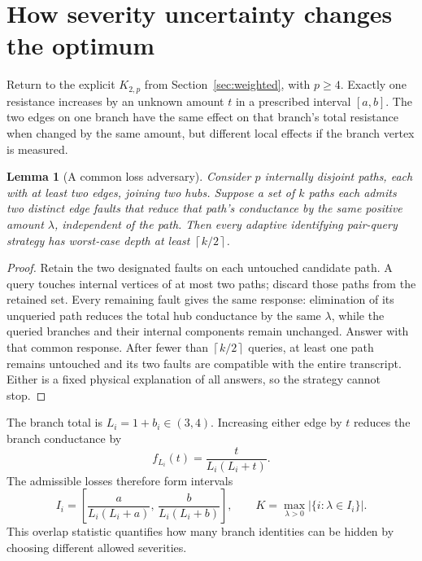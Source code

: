 \documentclass[11pt,letterpaper]{article}
\newtheorem{lemma}[theorem]{Lemma}
\newcommand{\ceil}[1]{\left\lceil #1\right\rceil}
\begin{document}
\section{How severity uncertainty changes the optimum}\label{sec:severity}
Return to the explicit $K_{2,p}$ from Section~\ref{sec:weighted}, with $p\ge4$. Exactly one resistance increases by an unknown amount $t$ in a prescribed interval $[a,b]$. The two edges on one branch have the same effect on that branch's total resistance when changed by the same amount, but different local effects if the branch vertex is measured.

\begin{lemma}[A common loss adversary]\label{lem:severitylower}
Consider $p$ internally disjoint paths, each with at least two edges, joining two hubs. Suppose a set of $k$ paths each admits two distinct edge faults that reduce that path's conductance by the same positive amount $\lambda$, independent of the path. Then every adaptive identifying pair-query strategy has worst-case depth at least $\ceil{k/2}$.
\end{lemma}
\begin{proof}
Retain the two designated faults on each untouched candidate path. A query touches internal vertices of at most two paths; discard those paths from the retained set. Every remaining fault gives the same response: elimination of its unqueried path reduces the total hub conductance by the same $\lambda$, while the queried branches and their internal components remain unchanged. Answer with that common response. After fewer than $\ceil{k/2}$ queries, at least one path remains untouched and its two faults are compatible with the entire transcript. Either is a fixed physical explanation of all answers, so the strategy cannot stop.
\end{proof}

The branch total is $L_i=1+b_i\in(3,4)$. Increasing either edge by $t$ reduces the branch conductance by
\[
 f_{L_i}(t)=\frac{t}{L_i(L_i+t)}.
\]
The admissible losses therefore form intervals
\[
 I_i=\left[\frac{a}{L_i(L_i+a)},\,\frac{b}{L_i(L_i+b)}\right],
 \qquad
 K=\max_{\lambda>0}|\{i:\lambda\in I_i\}|.
\]
This overlap statistic quantifies how many branch identities can be hidden by choosing different allowed severities.
\end{document}
